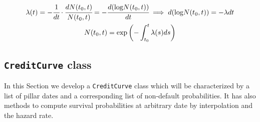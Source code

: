 \begin{equation}
\begin{gathered}
\lambda(t) = -\cfrac{1}{dt}\cdot\cfrac{dN(t_0, t)}{N(t_0, t)} = -\cfrac{d(\textrm{log}N(t_0, t))}{dt} \implies d(\textrm{log}N(t_0, t)) = -\lambda dt\\
N(t_0, t) = \mathrm{exp}\left(-\int_{t_0}^{t}\lambda(s) ds\right)
\end{gathered}
\end{equation}

\subsection{\texttt{CreditCurve} class}

In this Section we develop a \texttt{CreditCurve} class which will be characterized by a list of pillar dates and a corresponding list of non-default probabilities. It has also methods to compute survival probabilities at arbitrary date by interpolation and the hazard rate.
  
